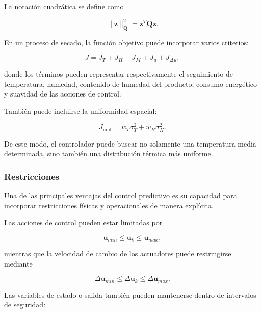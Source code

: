 La notación cuadrática se define como

\begin{equation}
\|\mathbf{z}\|_{\mathbf{Q}}^2
=
\mathbf{z}^{T}\mathbf{Q}\mathbf{z}.
\end{equation}

En un proceso de secado, la función objetivo puede incorporar varios criterios:

\begin{equation}
J
=
J_T
+
J_H
+
J_M
+
J_u
+
J_{\Delta u},
\end{equation}

donde los términos pueden representar respectivamente el seguimiento de temperatura, humedad, contenido de humedad del producto, consumo energético y suavidad de las acciones de control.

También puede incluirse la uniformidad espacial:

\begin{equation}
J_{\mathrm{unif}}
=
w_T\sigma_T^2
+
w_H\sigma_H^2.
\end{equation}

De este modo, el controlador puede buscar no solamente una temperatura media determinada, sino también una distribución térmica más uniforme.

\subsubsection{Restricciones}

Una de las principales ventajas del control predictivo es su capacidad para incorporar restricciones físicas y operacionales de manera explícita.

Las acciones de control pueden estar limitadas por

\begin{equation}
\mathbf{u}_{min}
\leq
\mathbf{u}_k
\leq
\mathbf{u}_{max},
\end{equation}

mientras que la velocidad de cambio de los actuadores puede restringirse mediante

\begin{equation}
\Delta\mathbf{u}_{min}
\leq
\Delta\mathbf{u}_k
\leq
\Delta\mathbf{u}_{max}.
\end{equation}

Las variables de estado o salida también pueden mantenerse dentro de intervalos de seguridad:

